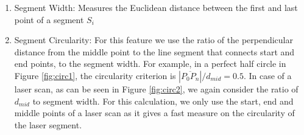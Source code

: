 \begin{enumerate}
\item Segment Width: Measures the Euclidean distance between the first and last point of a segment $S_i$

\item Segment Circularity: For this feature we use the ratio of the perpendicular distance from the middle point to the line segment that connects start and end points, to the segment width. For example, in a perfect half circle in Figure \ref{fig:circ1}, the circularity criterion is $|\overline{P_0P_n}|/d_{mid}=0.5$. In case of a laser scan, as can be seen in Figure \ref{fig:circ2}, we again consider the ratio of $d_{mid}$ to segment width. For this calculation, we only use the start, end and middle points of a laser scan as it gives a fast measure on the circularity of the laser segment.


\end{enumerate}

